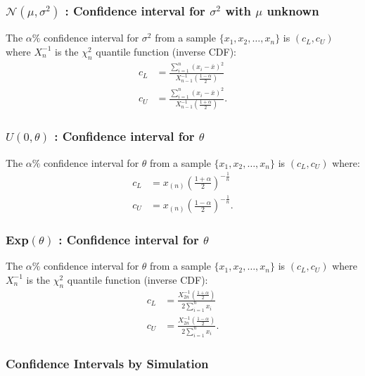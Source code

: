 \documentclass[a4paper, 12pt, twoside]{article}
\begin{document}
\subsubsection{$\mathcal{N}(\mu, \sigma^2)$ : Confidence
    interval for $\sigma^2$ with $\mu$ unknown}

The $\alpha\%$ confidence interval for $\sigma^2$ from a sample
$\{x_1, x_2, \ldots, x_n\}$ is $(c_L, c_U)$ where $X_n^{-1}$ is the
$\chi^2_n$ quantile function (inverse CDF):
\begin{align*}
    c_L & = \frac{\sum_{i = 1}^n(x_i - \overline{x})^2}
    {X_{n-1}^{-1}\left(\frac{1 - \alpha}{2}\right)}     \\
    c_U & = \frac{\sum_{i = 1}^n(x_i - \overline{x})^2}
    {X_{n-1}^{-1}\left(\frac{1 + \alpha}{2}\right)}.
\end{align*}

\subsubsection{$U(0, \theta)$ : Confidence interval for $\theta$}

The $\alpha\%$ confidence interval for $\theta$ from a sample
$\{x_1, x_2, \ldots, x_n\}$ is $(c_L, c_U)$ where:
\begin{align*}
    c_L & = x_{(n)}\left(\frac{1 + \alpha}{2}\right)^{-\frac{1}{n}}  \\
    c_U & = x_{(n)}\left(\frac{1 - \alpha}{2}\right)^{-\frac{1}{n}}.
\end{align*}

\subsubsection{Exp$(\theta)$ : Confidence interval for $\theta$}

The $\alpha\%$ confidence interval for $\theta$ from a sample
$\{x_1, x_2, \ldots, x_n\}$ is $(c_L, c_U)$ where $X_n^{-1}$ is the
$\chi^2_n$ quantile function (inverse CDF):
\begin{align*}
    c_L & = \frac{X_{2n}^{-1}\left(\frac{1 + \alpha}{2}\right)}
    {2\sum_{i = 1}^n x_i}                                       \\
    c_U & = \frac{X_{2n}^{-1}\left(\frac{1 - \alpha}{2}\right)}
    {2\sum_{i = 1}^n x_i}.
\end{align*}

\subsubsection{Confidence Intervals by Simulation}
\end{document}
